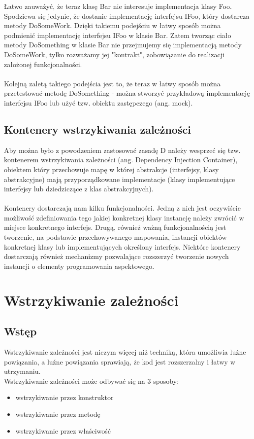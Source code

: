 \documentclass[12pt]{article}
\begin{document}
Łatwo zauważyć, że teraz klasę Bar nie interesuje implementacja klasy Foo. Spodziewa się jedynie, że dostanie implementację interfejsu IFoo, który dostarcza metody DoSomeWork. Dzięki takiemu podejściu w łatwy sposób można podmienić implementację interfejsu IFoo w klasie Bar. Zatem tworząc ciało metody DoSomething w klasie Bar nie przejmujemy się implementacją metody DoSomeWork, tylko rozważamy jej "kontrakt", zobowiązanie do realizacji założonej funkcjonalności.\\
\\
Kolejną zaletą takiego podejścia jest to, że teraz w łatwy sposób można przetestować metodę DoSomething - można stworzyć przykładową implementację interfejsu IFoo lub użyć tzw. obiektu zastępczego (ang. mock).


\subsection{Kontenery wstrzykiwania zależności}
Aby można było z powodzeniem zastosować zasadę D należy wesprzeć się tzw. kontenerem wstrzykiwania zależności (ang. Dependency Injection Container), obiektem który przechowuje mapę w której abstrakcje (interfejsy, klasy abstrakcyjne) mają przyporządkowane implementacje (klasy implementujące interfejsy lub dziedziczące z klas abstrakcyjnych).\\
\\
Kontenery dostarczają nam kilku funkcjonalności. Jedną z nich jest oczywiście możliwość zdefiniowania tego jakiej konkretnej klasy instancję należy zwrócić w miejsce konkretnego interfejs. Drugą, również ważną funkcjonalnością jest tworzenie, na podstawie przechowywanego mapowania, instancji obiektów konkretnej klasy lub implementujących określony interfejs. Niektóre kontenery dostarczają również mechanizmy pozwalające rozszerzyć tworzenie nowych instancji o elementy programowania aspektowego.



\clearpage
\section{Wstrzykiwanie zależności}
\subsection{Wstęp}
Wstrzykiwanie zależności jest niczym więcej niż techniką, która umożliwia luźne powiązania, a luźne powiązania sprawiają, że kod jest rozszerzalny i łatwy w utrzymaniu.\cite{dependency_injection}\\
Wstrzykiwanie zależności może odbywać się na 3 sposoby:
\begin{itemize}
	\item wstrzykiwanie przez konstruktor
	\item wstrzykiwanie przez metodę
	\item wstrzykiwanie przez właściwość
\end{itemize}
\end{document}
